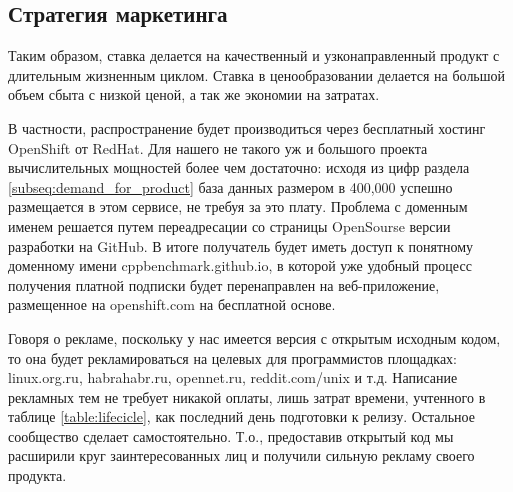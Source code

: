 \subsection{Стратегия маркетинга}
	Таким образом, ставка делается на качественный и узконаправленный продукт с длительным жизненным циклом. Ставка в ценообразовании делается на большой объем сбыта с низкой ценой, а так же экономии на затратах.
	
	В частности, распространение будет производиться через бесплатный хостинг OpenShift от RedHat. Для нашего не такого уж и большого проекта вычислительных мощностей более чем достаточно: исходя из цифр раздела \ref{subseq:demand_for_product} база данных размером в 400,000 успешно размещается в этом сервисе, не требуя за это плату. Проблема с доменным именем решается путем переадресации со страницы OpenSourse версии разработки на GitHub. В итоге получатель будет иметь доступ к понятному доменному имени cppbenchmark.github.io, в которой уже удобный процесс получения платной подписки будет перенаправлен на веб-приложение, размещенное на openshift.com на бесплатной основе. 
	
	Говоря о рекламе, поскольку у нас имеется версия с открытым исходным кодом, то она будет рекламироваться на целевых для программистов площадках: linux.org.ru, habrahabr.ru, opennet.ru, reddit.com/unix и т.д. Написание рекламных тем не требует никакой оплаты, лишь затрат времени, учтенного в таблице \ref{table:lifecicle}, как последний день подготовки к релизу. Остальное сообщество сделает самостоятельно. Т.о., предоставив открытый код мы расширили круг заинтересованных лиц и получили сильную рекламу своего продукта.